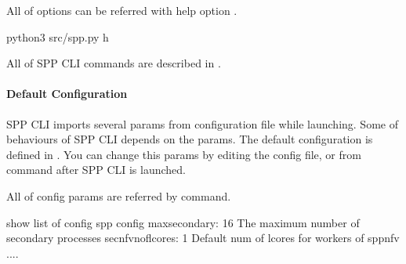 \documentclass[a4paper,11pt,openany,oneside,english]{sphinxmanual}
\begin{document}
All of options can be referred with help option .

\begin{sphinxVerbatim}[commandchars=\\\{\},formatcom=\footnotesize]
 python3 src/spp.py \PYGZhy{}h


\end{sphinxVerbatim}

All of SPP CLI commands are described in {\hyperref[\detokenize{commands/index::doc}]{}}.


\paragraph{Default Configuration}
\label{\detokenize{gsg/howto_use:default-configuration}}
SPP CLI imports several params from configuration file while launching.
Some of behaviours of SPP CLI depends on the params.
The default configuration is defined in
.
You can change this params by editing the config file, or from 
command after SPP CLI is launched.

All of config params are referred by  command.

\begin{sphinxVerbatim}[commandchars=\\\{\},formatcom=\footnotesize]
\PYGZsh{} show list of config
spp \PYGZgt{} config
\PYGZhy{} max\PYGZus{}secondary: \PYGZdq{}16\PYGZdq{}       \PYGZsh{} The maximum number of secondary processes
\PYGZhy{} sec\PYGZus{}nfv\PYGZus{}nof\PYGZus{}lcores: \PYGZdq{}1\PYGZdq{}   \PYGZsh{} Default num of lcores for workers of spp\PYGZus{}nfv
....
\end{sphinxVerbatim}
\end{document}
